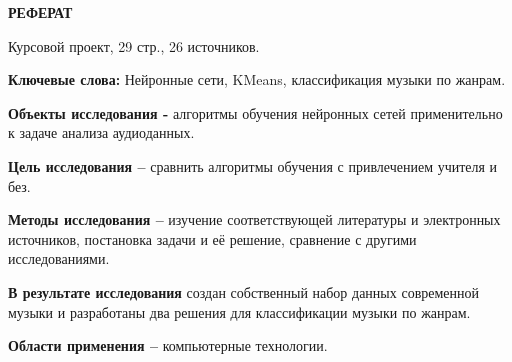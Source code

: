 \begin{center}
  \large\bfseries{РЕФЕРАТ}
\end{center}

Курсовой проект, 29 стр., 26 источников.

\textbf{Ключевые слова:} Нейронные сети, KMeans, классификация музыки по жанрам.

\textbf{Объекты исследования -} алгоритмы обучения нейронных сетей применительно к задаче анализа аудиоданных.

\textbf{Цель исследования --} сравнить алгоритмы обучения с привлечением учителя и без.

\textbf{Методы исследования --} изучение соответствующей литературы и электронных источников, постановка задачи и её решение, сравнение с другими исследованиями.

\textbf{В результате исследования} создан собственный набор данных современной музыки и разработаны два решения для классификации музыки по жанрам.

\textbf{Области применения --} компьютерные технологии.

\newpage